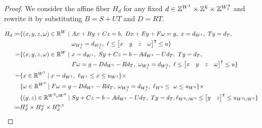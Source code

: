 \documentclass[pdflatex,sn-mathphys-num]{sn-jnl}%
\theoremstyle{thmstyleone}%
\theoremstyle{thmstylethree}%
\theoremstyle{thmstyletwo}%
\begin{document}
\begin{proof}
    We consider the affine fiber $H_d$ for any fixed $d\in \mathbb{Z}^{W^1} \times \mathbb{Z}^{k} \times \mathbb{Z}^{W^4_I}$ and rewrite it by substituting $B = S + U T$ and $D = R T$.
    
    \begin{align*}
      H_d \coloneqq& 
      \begin{aligned}[t]
          \{(x,y,z,\omega) \in \R^W \mid&~ A x + B y + C z = b,~ D x + E y + F \omega = g,~  x = d_{W^1},~ T y = d_T, \\&
       ~\omega_{W^4_I} = d_{W^4_I},~ \ell \leq \transpose{\begin{bmatrix}
        x &
        y &
        z &
        \omega
    \end{bmatrix}} \leq u \}
      \end{aligned}\\
      =& 
      \begin{aligned}[t]
          \{(x,y,z,\omega) \in \R^W \mid~&  x = d_{W^1},~ Sy + C z = b - A d_{W^1} - U d_{T},~ T y = d_T, \\
      &F \omega = g - D d_{W^1} - R d_T,~\omega_{W^4_I} = d_{W^4_I},~ \ell \leq \transpose{\begin{bmatrix}
        x &
        y &
        z &
        \omega
    \end{bmatrix}} \leq u \} 
      \end{aligned}\\
      = & \begin{aligned}[t]
      & \{x \in \R^{W^1} \mid x = d_{W^1}, ~\ell_{W^1} \leq x \leq u_{W^1} \} \times \\
      & \{\omega \in \R^{W^4} \mid F \omega = g - D d_{W^1} - R d_T, ~\omega_{W^4_I} = d_{W^4_I},~\ell_{W^4} \leq~ \omega \leq u_{W^4}\} \times \\
      &\{(y,z) \in \R^{W^2 \cup W^3} \mid Sy + C z = b - A d_{W^1} - U d_{T},~ T y = d_T, \ell_{W^2\cup W^3} \leq \transpose{\begin{bmatrix}
        y &
        z 
    \end{bmatrix}} \leq u_{W^2\cup W^3}\}
      \end{aligned}\\
    \coloneqq& H^{x}_d \times H^{\omega}_d \times H^{y,z}_d
    \end{align*}


\end{proof}
\end{document}
